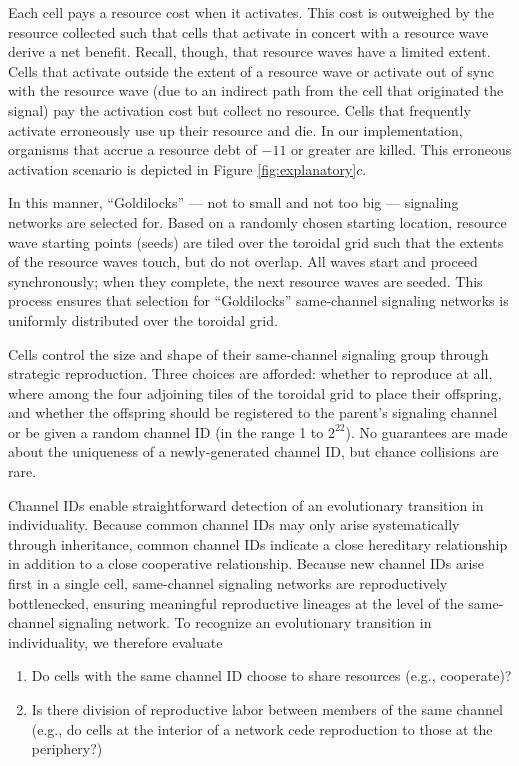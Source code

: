Each cell pays a resource cost when it activates.
This cost is outweighed by the resource collected such that cells that activate in concert with a resource wave derive a net benefit.
Recall, though, that resource waves have a limited extent.
Cells that activate outside the extent of a resource wave or activate out of sync with the resource wave (due to an indirect path from the cell that originated the signal) pay the activation cost but collect no resource.
Cells that frequently activate erroneously use up their resource and die.
In our implementation, organisms that accrue a resource debt of $-11$ or greater are killed.
This erroneous activation scenario is depicted in Figure \ref{fig:explanatory}$c$.

In this manner, ``Goldilocks'' --- not to small and not too big --- signaling networks are selected for.
Based on a randomly chosen starting location, resource wave starting points (seeds) are tiled over the toroidal grid such that the extents of the resource waves touch, but do not overlap.
All waves start and proceed synchronously;
when they complete, the next resource waves are seeded.
This process ensures that selection for ``Goldilocks'' same-channel signaling networks is uniformly distributed over the toroidal grid.

Cells control the size and shape of their same-channel signaling group through strategic reproduction.
Three choices are afforded: whether to reproduce at all, where among the four adjoining tiles of the toroidal grid to place their offspring, and whether the offspring should be registered to the parent's signaling channel or be given a random channel ID (in the range 1 to $2^{22}$).
No guarantees are made about the uniqueness of a newly-generated channel ID, but chance collisions are rare.

Channel IDs enable straightforward detection of an evolutionary transition in individuality.
Because common channel IDs may only arise systematically through inheritance, common channel IDs indicate a close hereditary relationship in addition to a close cooperative relationship.
Because new channel IDs arise first in a single cell, same-channel signaling networks are reproductively bottlenecked, ensuring meaningful reproductive lineages at the level of the same-channel signaling network.
To recognize an evolutionary transition in individuality, we therefore evaluate
\begin{enumerate}
\item Do cells with the same channel ID choose to share resources (e.g., cooperate)?
\item Is there division of reproductive labor between members of the same channel (e.g., do cells at the interior of a network cede reproduction to those at the periphery?)
\end{enumerate}

